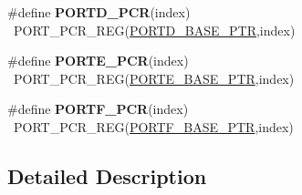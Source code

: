 \begin{DoxyCompactItemize}
\item 
\hypertarget{group___p_o_r_t___register___accessor___macros_gac2a3e9731320fb291256347dfee6d6c5}{}\#define {\bfseries P\+O\+R\+T\+D\+\_\+\+P\+C\+R}(index)                                              ~P\+O\+R\+T\+\_\+\+P\+C\+R\+\_\+\+R\+E\+G(\hyperlink{group___p_o_r_t___peripheral_ga7f5a263751543810ebfdbde278383276}{P\+O\+R\+T\+D\+\_\+\+B\+A\+S\+E\+\_\+\+P\+T\+R},index)\label{group___p_o_r_t___register___accessor___macros_gac2a3e9731320fb291256347dfee6d6c5}

\item 
\hypertarget{group___p_o_r_t___register___accessor___macros_ga34d5c13bac091141ec60f381569ea24d}{}\#define {\bfseries P\+O\+R\+T\+E\+\_\+\+P\+C\+R}(index)                                              ~P\+O\+R\+T\+\_\+\+P\+C\+R\+\_\+\+R\+E\+G(\hyperlink{group___p_o_r_t___peripheral_gab166fe285bbb15b52de610f408fe25d3}{P\+O\+R\+T\+E\+\_\+\+B\+A\+S\+E\+\_\+\+P\+T\+R},index)\label{group___p_o_r_t___register___accessor___macros_ga34d5c13bac091141ec60f381569ea24d}

\item 
\hypertarget{group___p_o_r_t___register___accessor___macros_gae10f09e3f48ae08a9fdcf3f49d38bc66}{}\#define {\bfseries P\+O\+R\+T\+F\+\_\+\+P\+C\+R}(index)                                              ~P\+O\+R\+T\+\_\+\+P\+C\+R\+\_\+\+R\+E\+G(\hyperlink{group___p_o_r_t___peripheral_gadda5d5c0c6f7d718ac2ea336aea4f905}{P\+O\+R\+T\+F\+\_\+\+B\+A\+S\+E\+\_\+\+P\+T\+R},index)\label{group___p_o_r_t___register___accessor___macros_gae10f09e3f48ae08a9fdcf3f49d38bc66}

\end{DoxyCompactItemize}


\subsection{Detailed Description}
